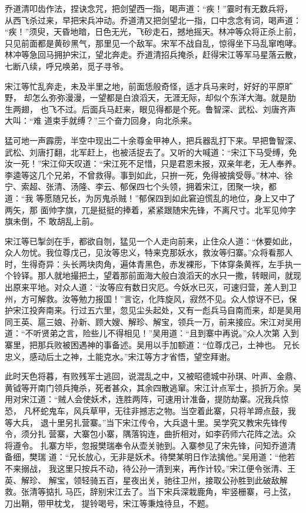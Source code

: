 乔道清叩齿作法，捏诀念咒，把剑望西一指，喝声道：“疾！”霎时有无数兵将，
从西飞杀过来，早把宋兵冲动。乔道清又把剑望北一指，口中念念有词，喝声道：
“疾！”须臾，天昏地暗，日色无光，飞砂走石，撼地摇天。林冲等众将正杀上前，
只见前面都是黄砂黑气，那里见一个敌军。宋军不战自乱，惊得坐下马乱窜咆哮。
林冲等急回马拥护宋江，望北奔走。乔道清招兵掩杀，赶得宋江等军马星落云散，
七断八续，呼兄唤弟，觅子寻爷。

宋江等忙乱奔走，未及半里之地，前面恁般奇怪，适才兵马来时，好好的平原旷野，
却怎么弥弥漫漫，一望都是白浪滔天，无涯无际，却似个东洋大海。就是肋生两翅，
也飞不过。后面兵马赶来，眼见得都是个死。鲁智深、武松、刘唐齐声大叫：“难
道束手就缚？”三个奋力回身，向北杀来。

猛可地一声霹雳，半空中现出二十余尊金甲神人，把兵器乱打下来。早把鲁智深、
武松、刘唐打翻，北军赶上，也被活捉去了。又听的大喊道：“宋江下马受缚，免
汝一死！”宋江仰天叹道：“宋江死不足惜，只是君恩未报，双亲年老，无人奉养。
李逵等这几个兄弟，不曾救得。事到如此，只拚一死，免得被擒受辱。”林冲、徐
宁、索超、张清、汤隆、李云、郁保四七个头领，拥着宋江，团聚一块，都道：“我
等愿随兄长，为厉鬼杀贼！”郁保四到如此窘迫慌乱的地位，身上又中了两矢，那
面帅字旗，兀是挺挺的捧着，紧紧跟随宋先锋，不离尺寸。北军见帅字旗未倒，不
敢胡乱上前。

宋江等已掣剑在手，都欲自刎，猛见一个人走向前来，止住众人道：“休要如此，
众人勿忧。我位尊戊己，见汝等忠义，特来克那妖水，救汝等归寨。”众将看那人
时，生得奇异：头长两块肉角，遍体青黑色，赤发裸形，下体穿条黄裈，左手执一
个铃铎。那人就地撮把土，望着那前面海大般白浪滔天的水只一撒，转眼间，就现
出原来平地。对众人道：“汝等应有数日灾厄。今妖水已灭，可速归营，差人到卫
州，方可解救。汝等勉力报国！”言讫，化阵旋风，寂然不见。众人惊讶不已，保
护宋江投奔南来。行过五六里，忽见尘头起处，又有一彪兵马自南而来，却是吴用
同王英、扈三娘、孙新、顾大嫂、解珍、解宝，领兵一万，前来接应。宋江对吴用
道：“不听贤弟之言，险些儿不得相见！”吴用道：“且到寨中再说。”众人次第
入到寨里，把那兵败被困遇神的事备述。吴用以手加额道：“位尊戊己，土神也。
兄长忠义，感动后土之神，土能克水。”宋江等方才省悟，望空拜谢。

此时天色将暮，有败残军士逃回，说混乱之中，又被昭德城中孙琪、叶声、金鼎、
黄钺等开南门领兵掩杀，死者甚众，其余四散逃窜。宋江计点军士，损折万余。吴
用对宋江道：“贼人会使妖术，连胜两阵，可速用计准备，提防劫寨。况我兵惊恐，
凡杯蛇鬼车，风兵草甲，无往非撼志之物。当空着此寨，只将羊蹄点鼓，我等大兵，
退十里另扎营寨。”当下宋江传令，大兵退十里。吴学究又教宋先锋传令，须分扎
营寨，大寨包小寨，隅落钩连，曲折相对，如李药师六花阵之法。众将遵令。
扎寨方毕，忽报樊瑞奉令从壶关驰到。入寨参见了宋先锋，问知乔道清备细，樊瑞
道：“兄长放心，无非是妖术。待樊某明日作法擒他。”吴用道：“他若不来搦战，
我这里只按兵不动，待公孙一清到来，再作计较。”宋江便令张清、王英、解珍、
解宝，领轻骑五百，星夜出关，驰往卫州，接取公孙胜到此破敌解救。张清等掂扎
马匹，辞别宋江去了。当下宋兵深栽鹿角，牢竖栅寨，弓上弦，刀出鞘，带甲枕戈，
提铃喝号，宋江等秉烛待旦，不题。

